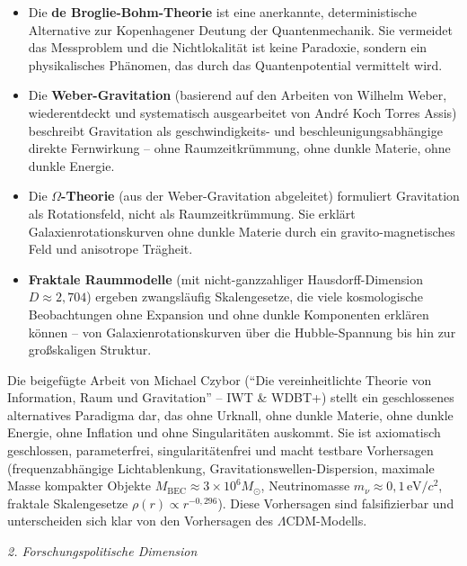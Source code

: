 \documentclass[11pt,a4paper]{letter}
\begin{document}
\begin{letter}
\begin{itemize}
    \item Die \textbf{de Broglie-Bohm-Theorie} ist eine anerkannte, deterministische Alternative zur Kopenhagener Deutung der Quantenmechanik. Sie vermeidet das Messproblem und die Nichtlokalität ist keine Paradoxie, sondern ein physikalisches Phänomen, das durch das Quantenpotential vermittelt wird.
    
    \item Die \textbf{Weber-Gravitation} (basierend auf den Arbeiten von Wilhelm Weber, wiederentdeckt und systematisch ausgearbeitet von André Koch Torres Assis) beschreibt Gravitation als geschwindigkeits- und beschleunigungsabhängige direkte Fernwirkung – ohne Raumzeitkrümmung, ohne dunkle Materie, ohne dunkle Energie.
    
    \item Die \textbf{$\Omega$-Theorie} (aus der Weber-Gravitation abgeleitet) formuliert Gravitation als Rotationsfeld, nicht als Raumzeitkrümmung. Sie erklärt Galaxienrotationskurven ohne dunkle Materie durch ein gravito-magnetisches Feld und anisotrope Trägheit.
    
    \item \textbf{Fraktale Raummodelle} (mit nicht-ganzzahliger Hausdorff-Dimension $D \approx 2,704$) ergeben zwangsläufig Skalengesetze, die viele kosmologische Beobachtungen ohne Expansion und ohne dunkle Komponenten erklären können – von Galaxienrotationskurven über die Hubble-Spannung bis hin zur großskaligen Struktur.
\end{itemize}

Die beigefügte Arbeit von Michael Czybor (\enquote{Die vereinheitlichte Theorie von Information, Raum und Gravitation} – IWT \& WDBT+) stellt ein geschlossenes alternatives Paradigma dar, das ohne Urknall, ohne dunkle Materie, ohne dunkle Energie, ohne Inflation und ohne Singularitäten auskommt. Sie ist axiomatisch geschlossen, parameterfrei, singularitätenfrei und macht testbare Vorhersagen (frequenzabhängige Lichtablenkung, Gravitationswellen-Dispersion, maximale Masse kompakter Objekte $M_{\text{BEC}} \approx 3 \times 10^6 M_\odot$, Neutrinomasse $m_\nu \approx 0,1\,\text{eV}/c^2$, fraktale Skalengesetze $\rho(r) \propto r^{-0,296}$). Diese Vorhersagen sind falsifizierbar und unterscheiden sich klar von den Vorhersagen des $\Lambda$CDM-Modells.

\vspace{0.2cm}

\noindent
\textit{2. Forschungspolitische Dimension}


\end{letter}
\end{document}
